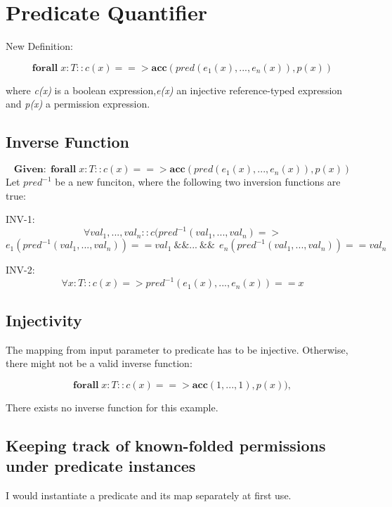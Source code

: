 \documentclass[12pt]{article}
\begin{document}
\maketitle

\section{Predicate Quantifier}
New Definition:

\begin{equation}
	\mathbf{forall} \; x:T :: c(x) ==>\mathbf{acc}( pred(e_1(x), ... ,e_n(x)), p(x) )
\end{equation}

where {\it c(x)} is  a boolean expression,{\it e(x)} an injective reference-typed expression and {\it p(x)} a permission expression.

\subsection{Inverse Function}

\[ \mathbf{Given: \; } \mathbf{forall} \; x:T :: c(x) ==> \mathbf{acc}( pred(e_1(x), ... ,e_n(x)), p(x) )   \]
Let  $pred^{- 1}$ be a new funciton, where the following two inversion functions are true:

INV-1:
\[ \forall val_1, ..., val_n :: c(pred^{-1} (val_1, ..., val_n) => \]
\[ e_1 (pred^{-1} (val_1, ..., val_n)) == val_1 \: \&\&  ... \: \&\&  \:\: e_n(pred^{-1} (val_1, ..., val_n)) == val_n\]


INV-2:
\[ \forall x:T :: c(x) => pred^{-1}(e_1(x), ..., e_n(x)) == x\]

\subsection{Injectivity}
The mapping from input parameter to predicate has to be injective. Otherwise, there might not be a valid inverse function:


\begin{equation}
	\mathbf{forall} \; x:T :: c(x) ==> \mathbf{acc}( 1, ... ,1), p(x) ) ,
\end{equation}

There exists no inverse function for this example.

\subsection{Keeping track of known-folded permissions under predicate instances}

I would instantiate a predicate and its map separately at first use.
\end{document}
